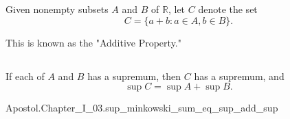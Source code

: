 \documentclass{report}
\begin{document}
  Given nonempty subsets $A$ and $B$ of $\mathbb{R}$, let $C$ denote the set
    $$C = \{a + b : a \in A, b \in B\}.$$

  \begin{note}
    This is known as the "Additive Property."
  \end{note}

\subsection{}%

  \begin{theorem}[I.33a]
    If each of $A$ and $B$ has a supremum, then $C$ has a supremum, and
      $$\sup{C} = \sup{A} + \sup{B}.$$
  \end{theorem}

    {Apostol.Chapter\_I\_03.sup\_minkowski\_sum\_eq\_sup\_add\_sup}
\end{document}
